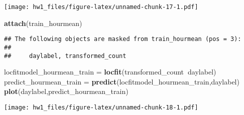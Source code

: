 \documentclass[]{article}
\newenvironment{Shaded}{\begin{snugshade}}{\end{snugshade}}
\newcommand{\KeywordTok}[1]{\textcolor[rgb]{0.13,0.29,0.53}{\textbf{#1}}}
\newcommand{\DataTypeTok}[1]{\textcolor[rgb]{0.13,0.29,0.53}{#1}}
\newcommand{\DecValTok}[1]{\textcolor[rgb]{0.00,0.00,0.81}{#1}}
\newcommand{\StringTok}[1]{\textcolor[rgb]{0.31,0.60,0.02}{#1}}
\newcommand{\OperatorTok}[1]{\textcolor[rgb]{0.81,0.36,0.00}{\textbf{#1}}}
\newcommand{\NormalTok}[1]{#1}
\begin{document}
\begin{Shaded}
\end{Shaded}

\texttt{[image: hw1\_files/figure-latex/unnamed-chunk-17-1.pdf]}

\begin{Shaded}
\begin{Highlighting}[]
\KeywordTok{attach}\NormalTok{(train_hourmean)}
\end{Highlighting}
\end{Shaded}

\begin{verbatim}
## The following objects are masked from train_hourmean (pos = 3):
## 
##     daylabel, transformed_count
\end{verbatim}

\begin{Shaded}
\begin{Highlighting}[]
\NormalTok{locfitmodel_hourmean_train =}\StringTok{ }\KeywordTok{locfit}\NormalTok{(transformed_count}\OperatorTok{~}\NormalTok{daylabel)}
\NormalTok{predict_hourmean_train =}\StringTok{ }\KeywordTok{predict}\NormalTok{(locfitmodel_hourmean_train,daylabel)}
\KeywordTok{plot}\NormalTok{(daylabel,predict_hourmean_train)}
\end{Highlighting}
\end{Shaded}

\texttt{[image: hw1\_files/figure-latex/unnamed-chunk-18-1.pdf]}
\end{document}
